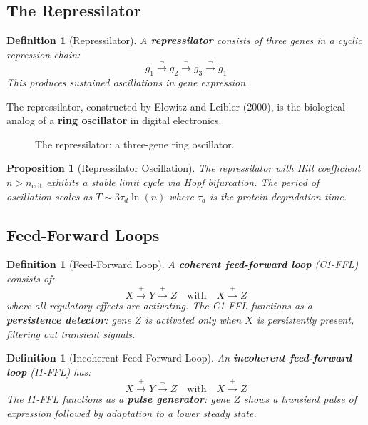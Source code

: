 \documentclass[12pt,a4paper]{article}
\newtheorem{proposition}[theorem]{Proposition}
\newtheorem{definition}[theorem]{Definition}
\begin{document}
\subsection{The Repressilator}

\begin{definition}[Repressilator]\label{def:repressilator}
A \textbf{repressilator} consists of three genes in a cyclic repression chain:
\[
g_1 \xrightarrow{\neg} g_2 \xrightarrow{\neg} g_3 \xrightarrow{\neg} g_1
\]
This produces sustained oscillations in gene expression.
\end{definition}

The repressilator, constructed by Elowitz and Leibler (2000), is the biological analog of a \textbf{ring oscillator} in digital electronics.

\begin{figure}[H]
\centering
{}
\caption{The repressilator: a three-gene ring oscillator.}
\label{fig:repressilator}
\end{figure}

\begin{proposition}[Repressilator Oscillation]\label{prop:repressilator}
The repressilator with Hill coefficient $n > n_{\text{crit}}$ exhibits a stable limit cycle via Hopf bifurcation.  The period of oscillation scales as $T \sim 3\tau_d \ln(n)$ where $\tau_d$ is the protein degradation time.
\end{proposition}

\subsection{Feed-Forward Loops}

\begin{definition}[Feed-Forward Loop]\label{def:ffl}
A \textbf{coherent feed-forward loop} (C1-FFL) consists of:
\[
X \xrightarrow{+} Y \xrightarrow{+} Z \quad \text{with} \quad X \xrightarrow{+} Z
\]
where all regulatory effects are activating.  The C1-FFL functions as a \textbf{persistence detector}: gene $Z$ is activated only when $X$ is persistently present, filtering out transient signals.
\end{definition}

\begin{definition}[Incoherent Feed-Forward Loop]\label{def:iffl}
An \textbf{incoherent feed-forward loop} (I1-FFL) has:
\[
X \xrightarrow{+} Y \xrightarrow{\neg} Z \quad \text{with} \quad X \xrightarrow{+} Z
\]
The I1-FFL functions as a \textbf{pulse generator}: gene $Z$ shows a transient pulse of expression followed by adaptation to a lower steady state.
\end{definition}
\end{document}

